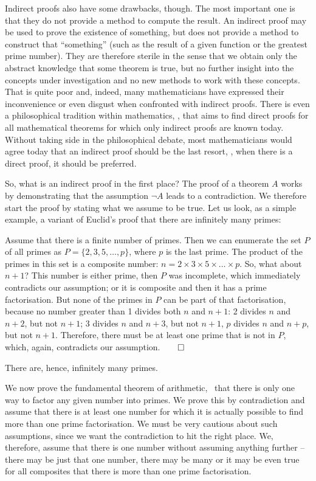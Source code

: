 \documentclass{scrreprt}
\begin{document}
Indirect proofs also have some drawbacks, though.
The most important one is that they do not provide
a method to compute the result.
An indirect proof may be used to prove the existence of something,
but does not provide a method to construct that ``something''
(such as the result of a given function or the greatest prime number).
They are therefore sterile in the sense
that we obtain only the abstract knowledge that some theorem is true,
but no further insight into the concepts under investigation
and no new methods to work with these concepts.
That is quite poor and, indeed, many mathematicians have expressed
their inconvenience or even disgust when confronted
with indirect proofs.
There is even a philosophical tradition within mathematics,
, that aims to find direct proofs
for all mathematical theorems for which only indirect proofs
are known today.
Without taking side in the philosophical debate,
most mathematicians would agree today that an indirect proof
should be the last resort,
\ie, when there is a direct proof, it should be preferred.

So, what is an indirect proof in the first place?
The proof of a theorem $A$ works by demonstrating that 
the assumption $\neg{A}$ leads to a contradiction.
We therefore start the proof by stating what we assume
to be true. Let us look, as a simple example,
a variant of Euclid's proof
that there are infinitely many primes:

Assume that there is a finite number of primes.
Then we can enumerate the set $P$ of all primes as
$P = \lbrace 2,3,5, \dots, p\rbrace$, where $p$ is the last prime.
The product of the primes in this set is a composite number:
$n = 2 \times 3 \times 5 \times \dots \times p$.
So, what about $n + 1$?
This number is either prime, then $P$ was incomplete,
which immediately contradicts our assumption;
or it is composite and then
it has a prime factorisation.
But none of the primes in $P$ can be part of that factorisation,
because no number greater than 1 divides both $n$ and $n+1$:
2 divides $n$ and $n+2$, but not $n+1$;
3 divides $n$ and $n+3$, but not $n+1$,
$p$ divides $n$ and $n+p$, but not $n+1$.
Therefore, there must be at least one prime
that is not in $P$, which, again, contradicts our assumption.$\qed$

There are, hence, infinitely many primes.

We now prove the fundamental theorem of arithmetic,
\ie\ that there is only one way
to factor any given number into primes.
We prove this by contradiction and assume
that there is at least one number 
for which it is actually possible to find
more than one prime factorisation.
We must be very cautious about such assumptions,
since we want the contradiction to hit the right place.
We, therefore, assume that there is 
one number without assuming anything further --
there may be just that one number,
there may be many or it may be even true
for all composites that there is 
more than one prime factorisation.
\end{document}
